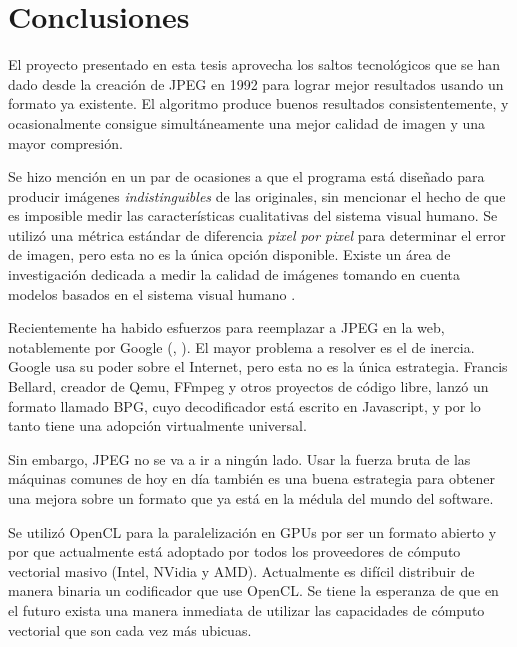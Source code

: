 
\chapter{Conclusiones}\label{ch:conclusiones}

El proyecto presentado en esta tesis aprovecha los saltos tecnológicos que se
han dado desde la creación de JPEG en 1992 \cite{jpeg-spec} para lograr mejor
resultados usando un formato ya existente. El algoritmo produce buenos
resultados consistentemente, y ocasionalmente consigue simultáneamente una
mejor calidad de imagen y una mayor compresión.

Se hizo mención en un par de ocasiones a que el programa está diseñado para
producir imágenes \emph{indistinguibles} de las originales, sin mencionar el
hecho de que es imposible medir las características cualitativas del sistema
visual humano. Se utilizó una métrica estándar de diferencia \emph{pixel por
pixel} para determinar el error de imagen, pero esta no es la única opción
disponible. Existe un área de investigación dedicada a medir la calidad de
imágenes tomando en cuenta modelos basados en el sistema visual humano
\cite{subjective-paper}.

Recientemente ha habido esfuerzos para reemplazar a JPEG en la web,
notablemente por Google (\cite{brotli}, \cite{webp}). El mayor problema a
resolver es el de inercia. Google usa su poder sobre el Internet, pero esta no
es la única estrategia. Francis Bellard, creador de Qemu, FFmpeg y otros
proyectos de código libre, lanzó un formato llamado \gls{BPG}, cuyo
decodificador está escrito en Javascript, y por lo tanto tiene una adopción
virtualmente universal.

Sin embargo, JPEG no se va a ir a ningún lado. Usar la fuerza bruta de las
máquinas comunes de hoy en día también es una buena estrategia para obtener una
mejora sobre un formato que ya está en la médula del mundo del software.

Se utilizó OpenCL para la paralelización en GPUs por ser un formato abierto y
por que actualmente está adoptado por todos los proveedores de cómputo
vectorial masivo (Intel, NVidia y AMD). Actualmente es difícil distribuir de
manera binaria un codificador que use OpenCL. Se tiene la esperanza de que en
el futuro exista una manera inmediata de utilizar las capacidades de cómputo
vectorial que son cada vez más ubicuas.

